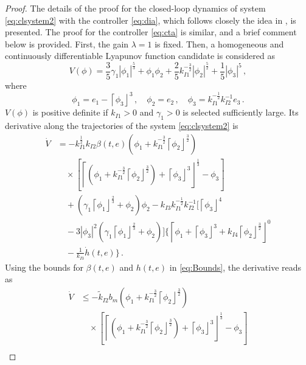 \documentclass[journal,twoside,web]{ieeecolor}
\newcommand{\Sabs}[1]{\left\lceil #1 \right\rfloor}
\newcommand{\abs}[1]{\left| #1 \right|}
\begin{document}
\begin{proof}
The details of the proof for the closed-loop dynamics of system \eqref{eq:clsystem2} with the controller \eqref{eq:dia}, which follows closely the idea in \cite{b:MERCADOURIBE2020109018,b:Gutierrez-Mercado-Moreno-Fridman-IJRNC2020}, is presented. The proof for the controller \eqref{eq:cta} is similar, and a brief comment below is provided. First, the gain $\lambda=1$ is fixed. Then, a homogeneous and continuously differentiable Lyapunov function candidate is considered as
\begin{equation*}
V(\phi)=\frac{3}{5}\gamma_{1}\abs{\phi_{1}}^{\frac{5}{3}}+\phi_{1}\phi_{2}+\frac{2}{5}k_{I1}^{-\frac{3}{2}}\abs{\phi_{2}}^{\frac{5}{2}}+\frac{1}{5}\abs{\phi_{3}}^{5}\,, 
\end{equation*}
where 
\begin{equation*}
\phi_{1}= e_{1}-\Sabs{\phi_{3}}^{3}\,,\quad 
\phi_{2}=  e_{2}\,,\quad
\phi_{3}=  k_{I1}^{-\frac{1}{2}}k_{I2}^{-1}e_{3}\,.
\end{equation*}
$V\left(\phi\right)$ is positive definite if $k_{I1}>0$ and $\gamma_{1}>0$ is selected sufficiently large. Its derivative along the trajectories of the system \eqref{eq:clsystem2} is
{\small
\begin{align*}
\dot{V} & =-k_{I1}^{\frac{1}{2}}k_{I2}\beta(t,e)\left(\phi_{1}+k_{I1}^{-\frac{3}{2}}\Sabs{\phi_{2}}^{\frac{3}{2}}\right)\\ 
&\quad \times \left[\Sabs{\left(\phi_{1}+k_{I1}^{-\frac{3}{2}}\Sabs{\phi_{2}}^{\frac{3}{2}}\right)+\Sabs{\phi_{3}}^{3}}^{\frac{1}{3}}-\phi_{3}\right]\\
 &\quad + \left(\gamma_{1}\Sabs{\phi_{1}}^{\frac{2}{3}}+\phi_{2}\right)\phi_{2}-k_{I3}k_{I1}^{-\frac{1}{2}}k_{I2}^{-1}\Big[\Sabs{\phi_{3}}^{4} \\
 &\quad -3\abs{\phi_{3}}^{2}\left(\gamma_{1}\Sabs{\phi_{1}}^{\frac{2}{3}}+\phi_{2}\right)\Big]\Bigg\{ \Sabs{\phi_{1}+\Sabs{\phi_{3}}^{3}+k_{I4}\Sabs{\phi_{2}}^{\frac{3}{2}}}^{0}\\
 &\quad -\frac{1}{k_{I3}}\dot{h}(t,e)\Bigg\} \,.
\end{align*}}
Using the bounds for $\beta(t,e)$ and $h(t,e)$ in \eqref{eq:Bounds}, the derivative reads as
{\small
\begin{align*}
\dot{V} &\leq-\tilde{k}_{I2}b_{m}\left(\phi_{1}+k_{I1}^{-\frac{3}{2}}\Sabs{\phi_{2}}^{\frac{3}{2}}\right)\\
&\quad \times \left[\Sabs{\left(\phi_{1}+k_{I1}^{-\frac{3}{2}}\Sabs{\phi_{2}}^{\frac{3}{2}}\right)+\Sabs{\phi_{3}}^{3}}^{\frac{1}{3}}-\phi_{3}\right]\\

\end{align*}}
\end{proof}
\end{document}

